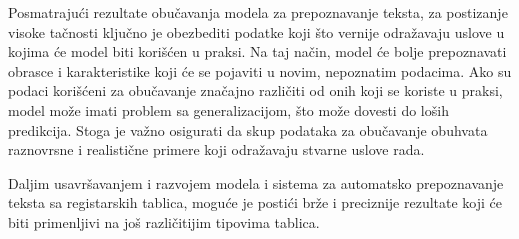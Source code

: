 \documentclass[a4paper,12pt]{article}
\begin{document}
	Posmatrajući rezultate obučavanja modela za prepoznavanje teksta, za postizanje visoke tačnosti ključno je obezbediti podatke koji što vernije odražavaju uslove u kojima će model biti korišćen u praksi. Na taj način, model će bolje prepoznavati obrasce i karakteristike koji će se pojaviti u novim, nepoznatim podacima. Ako su podaci korišćeni za obučavanje značajno različiti od onih koji se koriste u praksi, model može imati problem sa generalizacijom, što može dovesti do loših predikcija. Stoga je važno osigurati da skup podataka za obučavanje obuhvata raznovrsne i realistične primere koji odražavaju stvarne uslove rada.
	
	Daljim usavršavanjem i razvojem modela i sistema za automatsko prepoznavanje teksta sa registarskih tablica, moguće je postići brže i preciznije rezultate koji će biti primenljivi na još različitijim tipovima tablica.
	\newpage
	
	\printbibliography
\end{document}

